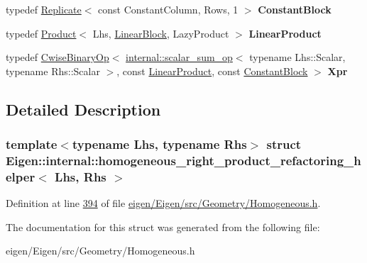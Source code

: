 \begin{DoxyCompactItemize}
typedef \hyperlink{group___core___module_class_eigen_1_1_replicate}{Replicate}$<$ const Constant\+Column, Rows, 1 $>$ {\bfseries Constant\+Block}
\item 
\mbox{\label{struct_eigen_1_1internal_1_1homogeneous__right__product__refactoring__helper_ad60a835dcc4b95f5118123bb5e5cfb53}} 
typedef \hyperlink{group___core___module_class_eigen_1_1_product}{Product}$<$ Lhs, \hyperlink{group___sparse_core___module}{Linear\+Block}, Lazy\+Product $>$ {\bfseries Linear\+Product}
\item 
\mbox{\label{struct_eigen_1_1internal_1_1homogeneous__right__product__refactoring__helper_aeaa3560faf70646f25a02c521bc42f26}} 
typedef \hyperlink{group___core___module_class_eigen_1_1_cwise_binary_op}{Cwise\+Binary\+Op}$<$ \hyperlink{struct_eigen_1_1internal_1_1scalar__sum__op}{internal\+::scalar\+\_\+sum\+\_\+op}$<$ typename Lhs\+::\+Scalar, typename Rhs\+::\+Scalar $>$, const \hyperlink{group___core___module_class_eigen_1_1_product}{Linear\+Product}, const \hyperlink{group___core___module_class_eigen_1_1_replicate}{Constant\+Block} $>$ {\bfseries Xpr}
\end{DoxyCompactItemize}


\subsection{Detailed Description}
\subsubsection*{template$<$typename Lhs, typename Rhs$>$\newline
struct Eigen\+::internal\+::homogeneous\+\_\+right\+\_\+product\+\_\+refactoring\+\_\+helper$<$ Lhs, Rhs $>$}



Definition at line \hyperlink{eigen_2_eigen_2src_2_geometry_2_homogeneous_8h_source_l00394}{394} of file \hyperlink{eigen_2_eigen_2src_2_geometry_2_homogeneous_8h_source}{eigen/\+Eigen/src/\+Geometry/\+Homogeneous.\+h}.



The documentation for this struct was generated from the following file\+:\begin{DoxyCompactItemize}
\item 
eigen/\+Eigen/src/\+Geometry/\+Homogeneous.\+h\end{DoxyCompactItemize}
